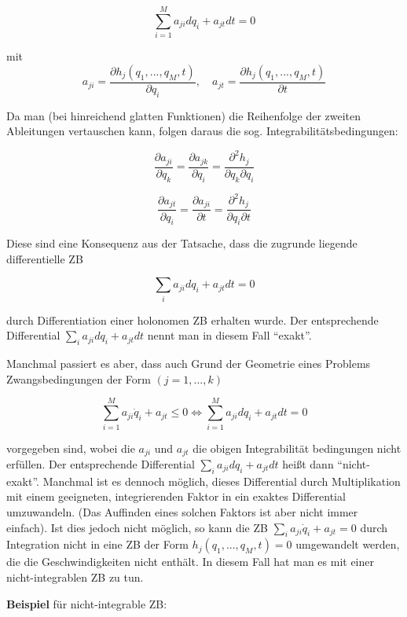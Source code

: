 \documentclass[10pt, letterpaper]{article}
\begin{document}
\begin{equation*}
\sum_{i=1}^M a_{ji}dq_i + a_{jt}dt = 0
\end{equation*}

mit \[a_{ji} = \frac{\partial h_j(q_1,...,q_M,t)}{\partial q_i}, \quad a_{jt} = \frac{\partial h_j(q_1,...,q_M,t)}{\partial t}\]

Da man (bei hinreichend glatten Funktionen) die Reihenfolge der zweiten Ableitungen vertauschen kann, folgen daraus die sog. Integrabilitätsbedingungen:

\begin{equation*}
\frac{\partial a_{ji}}{\partial q_k} = \frac{\partial a_{jk}}{\partial q_i} = \frac{\partial^2 h_j}{\partial q_k \partial q_i}
\end{equation*}

\begin{equation*}
\frac{\partial a_{jt}}{\partial q_i} = \frac{\partial a_{ji}}{\partial t} = \frac{\partial^2 h_j}{\partial q_i \partial t}
\end{equation*}

Diese sind eine Konsequenz aus der Tatsache, dass die zugrunde liegende differentielle ZB

\[\sum_i a_{ji}dq_i + a_{jt}dt = 0\]

durch Differentiation einer holonomen ZB erhalten wurde.
Der entsprechende Differential $\sum_i a_{ji} dq_i + a_{jt} dt$ nennt man in diesem Fall ``exakt''.

Manchmal passiert es aber, dass auch Grund der Geometrie eines Problems Zwangsbedingungen der Form $(j=1,...,k)$

\[\sum_{i=1}^M a_{ji} \dot{q}_i + a_{jt} \leq 0 \Leftrightarrow \sum_{i=1}^M a_{ji} dq_i + a_{jt} dt = 0\]

vorgegeben sind, wobei die $a_{ji}$ und $a_{jt}$ die obigen Integrabilität bedingungen nicht erfüllen. Der entsprechende Differential $\sum_i a_{ji} dq_i + a_{jt} dt$ heißt dann ``nicht-exakt''. Manchmal ist es dennoch möglich, dieses Differential durch Multiplikation mit einem geeigneten, integrierenden Faktor in ein exaktes Differential umzuwandeln. (Das Auffinden eines solchen Faktors ist aber nicht immer einfach). Ist dies jedoch nicht möglich, so kann die ZB $\sum_i a_{ji} \dot{q}_i + a_{jt} = 0$ durch Integration nicht in eine ZB der Form $h_j(q_1,...,q_M,t) = 0$ umgewandelt werden, die die Geschwindigkeiten nicht enthält. In diesem Fall hat man es mit einer nicht-integrablen ZB zu tun.

\textbf{Beispiel} für nicht-integrable ZB:
\end{document}
